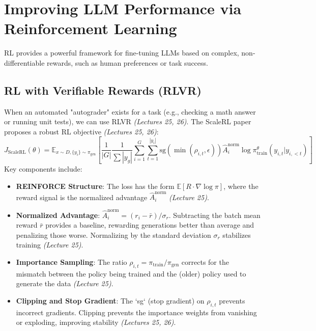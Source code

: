 \documentclass[11pt]{article}
\newcommand{\E}{\mathbb{E}}
\newcommand{\grad}{\nabla}
\begin{document}
\section{Improving LLM Performance via Reinforcement Learning}
RL provides a powerful framework for fine-tuning LLMs based on complex, non-differentiable rewards, such as human preferences or task success.

\subsection{RL with Verifiable Rewards (RLVR)}
When an automated "autograder" exists for a task (e.g., checking a math answer or running unit tests), we can use RLVR \textit{(Lectures 25, 26)}. The ScaleRL paper proposes a robust RL objective \textit{(Lectures 25, 26)}:
\[ J_{\text{ScaleRL}}(\theta) = \E_{x \sim D, \{y_i\} \sim \pi_{\text{gen}}} \left[ \frac{1}{|G|} \frac{1}{\sum |y_g|} \sum_{i=1}^G \sum_{t=1}^{|y_i|} \text{sg}\left(\min(\rho_{i,t}, \epsilon)\right) \hat{A}_i^{\text{norm}} \log \pi_{\text{train}}^\theta(y_{i,t} | y_{i,<t}) \right] \]
Key components include:
\begin{itemize}
    \item \textbf{REINFORCE Structure}: The loss has the form $\E[R \cdot \grad \log \pi]$, where the reward signal is the normalized advantage $\hat{A}_i^{\text{norm}}$ \textit{(Lecture 25)}.
    \item \textbf{Normalized Advantage}: $\hat{A}_i^{\text{norm}} = (r_i - \bar{r})/\sigma_r$. Subtracting the batch mean reward $\bar{r}$ provides a baseline, rewarding generations better than average and penalizing those worse. Normalizing by the standard deviation $\sigma_r$ stabilizes training \textit{(Lecture 25)}.
    \item \textbf{Importance Sampling}: The ratio $\rho_{i,t} = \pi_{\text{train}}/\pi_{\text{gen}}$ corrects for the mismatch between the policy being trained and the (older) policy used to generate the data \textit{(Lecture 25)}.
    \item \textbf{Clipping and Stop Gradient}: The `sg` (stop gradient) on $\rho_{i,t}$ prevents incorrect gradients. Clipping prevents the importance weights from vanishing or exploding, improving stability \textit{(Lectures 25, 26)}.
\end{itemize}
\end{document}

